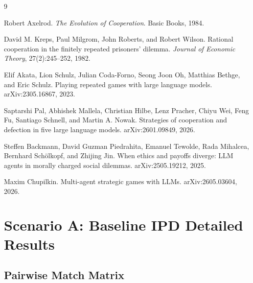 \documentclass[11pt]{article}
\begin{document}
\newpage
\begin{thebibliography}{9}

Robert Axelrod.
\newblock \textit{The Evolution of Cooperation}.
\newblock Basic Books, 1984.

David M. Kreps, Paul Milgrom, John Roberts, and Robert Wilson.
\newblock Rational cooperation in the finitely repeated prisoners' dilemma.
\newblock \textit{Journal of Economic Theory}, 27(2):245--252, 1982.

Elif Akata, Lion Schulz, Julian Coda-Forno, Seong Joon Oh, Matthias Bethge, and Eric Schulz.
\newblock Playing repeated games with large language models.
\newblock arXiv:2305.16867, 2023.

Saptarshi Pal, Abhishek Mallela, Christian Hilbe, Lenz Pracher, Chiyu Wei, Feng Fu, Santiago Schnell, and Martin A. Nowak.
\newblock Strategies of cooperation and defection in five large language models.
\newblock arXiv:2601.09849, 2026.

Steffen Backmann, David Guzman Piedrahita, Emanuel Tewolde, Rada Mihalcea, Bernhard Schölkopf, and Zhijing Jin.
\newblock When ethics and payoffs diverge: LLM agents in morally charged social dilemmas.
\newblock arXiv:2505.19212, 2025.

Maxim Chupilkin.
\newblock Multi-agent strategic games with LLMs.
\newblock arXiv:2605.03604, 2026.

\end{thebibliography}

\appendix

\clearpage
\section{Scenario A: Baseline IPD Detailed Results}
\label{app:baseline_details}

\subsection{Pairwise Match Matrix}
\end{document}
